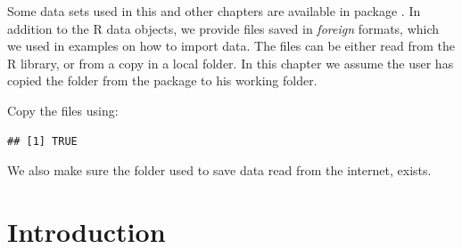 \documentclass[krantz2]{krantz}\usepackage{knitr}%
\begin{document}
\begin{infobox}
Some data sets used in this and other chapters are available in package . In addition to the
R data objects, we provide files saved in \emph{foreign} formats, which we used in examples on how to import data. The files can be either read from the R library, or from a copy in a local folder. In this chapter we
assume the user has copied the folder  from the package to his working folder.

Copy the files using:

\begin{knitrout}\footnotesize
{}\color{fgcolor}\begin{kframe}
\begin{alltt}
 \hlkwb{<-} \hlstd{(}\hlstd{,}  \hlstd{=} \hlstd{)}
 \hlstd{,}  \hlstd{=} \hlstd{,}  \hlstd{=} \hlstd{)}
\end{alltt}
\begin{verbatim}
## [1] TRUE
\end{verbatim}
\end{kframe}
\end{knitrout}

We also make sure the folder used to save data read from the internet, exists.

\begin{knitrout}\footnotesize
{}\color{fgcolor}\begin{kframe}
\begin{alltt}
 \hlkwb{=} 
 \hlstd{(}\hlopt{!}
\hlstd{\}}
\end{alltt}
\end{kframe}
\end{knitrout}
\end{infobox}

\section{Introduction}
\end{document}
